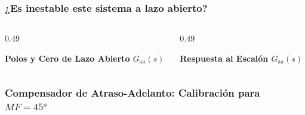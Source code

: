 \begin{frame}
  \frametitle{¿Es inestable este sistema a lazo abierto?}

  \begin{columns}[c, onlytextwidth]
    \begin{column}{0.49\textwidth}
      \begin{tarjeta}[top=5pt, bottom=5pt]
        {\centering\fontsize{8.5pt}{10.5pt}\selectfont \textbf{\color{NavyDark} Polos y Cero de Lazo Abierto $G_{\text{aa}}(s)$}\par}
        \vspace{2pt}
        \centering
      \end{tarjeta}
    \end{column}

    \begin{column}{0.49\textwidth}
      \begin{tarjeta}[top=5pt, bottom=5pt]
        {\centering\fontsize{8.5pt}{10.5pt}\selectfont \textbf{\color{NavyDark} Respuesta al Escalón $G_{\text{aa}}(s)$}\par}
        \vspace{2pt}
        \centering
      \end{tarjeta}
    \end{column}
  \end{columns}
\end{frame}

\begin{frame}
  \frametitle{Compensador de Atraso-Adelanto: Calibración para $MF = \ang{45}$}

  \centering
\end{frame}

